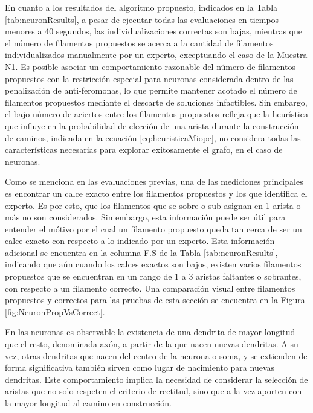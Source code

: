 En cuanto a los resultados del algoritmo propuesto, indicados en la Tabla \ref{tab:neuronResults}, a pesar de ejecutar todas las evaluaciones en tiempos menores a 40 segundos, las individualizaciones correctas son bajas, mientras que el n\'umero de filamentos propuestos se acerca a la cantidad de filamentos individualizados manualmente por un experto, exceptuando el caso de la Muestra N1. Es posible asociar un comportamiento razonable del n\'umero de filamentos propuestos con la restricci\'on especial para neuronas considerada dentro de las penalizaci\'on de anti-feromonas, lo que permite mantener acotado el n\'umero de filamentos propuestos mediante el descarte de soluciones infactibles. Sin embargo, el bajo n\'umero de aciertos entre los filamentos propuestos refleja que la heur\'istica que influye en la probabilidad de elecci\'on de una arista durante la construcci\'on de caminos, indicada en la ecuaci\'on \ref{eq:heuristicaMiope}, no considera todas las caracter\'isticas necesarias para explorar exitosamente el grafo, en el caso de neuronas. 

Como se menciona en las evaluaciones previas, una de las mediciones principales es encontrar un calce exacto entre los filamentos propuestos y los que identifica el experto. Es por esto, que los filamentos que se sobre o sub asignan en 1 arista o m\'as no son considerados. Sin embargo, esta informaci\'on puede ser \'util para entender el m\'otivo por el cual un filamento propuesto queda tan cerca de ser un calce exacto con respecto a lo indicado por un experto. Esta informaci\'on adicional se encuentra en la columna F.S de la Tabla \ref{tab:neuronResults}, indicando que a\'un cuando los calces exactos son bajos, existen varios filamentos propuestos que se encuentran en un rango de 1 a 3 aristas faltantes o sobrantes, con respecto a un filamento correcto. Una comparaci\'on visual entre filamentos propuestos y correctos para las pruebas de esta secci\'on se encuentra en la Figura \ref{fig:NeuronPropVsCorrect}.

En las neuronas es observable la existencia de una dendrita de mayor longitud que el resto, denominada axón, a partir de la que nacen nuevas dendritas. A su vez, otras dendritas que nacen del centro de la neurona o soma, y se extienden de forma significativa tambi\'en sirven como lugar de nacimiento para nuevas dendritas. Este comportamiento implica la necesidad de considerar la selecci\'on de aristas que no solo respeten el criterio de rectitud, sino que a la vez aporten con la mayor longitud al camino en construcci\'on.


